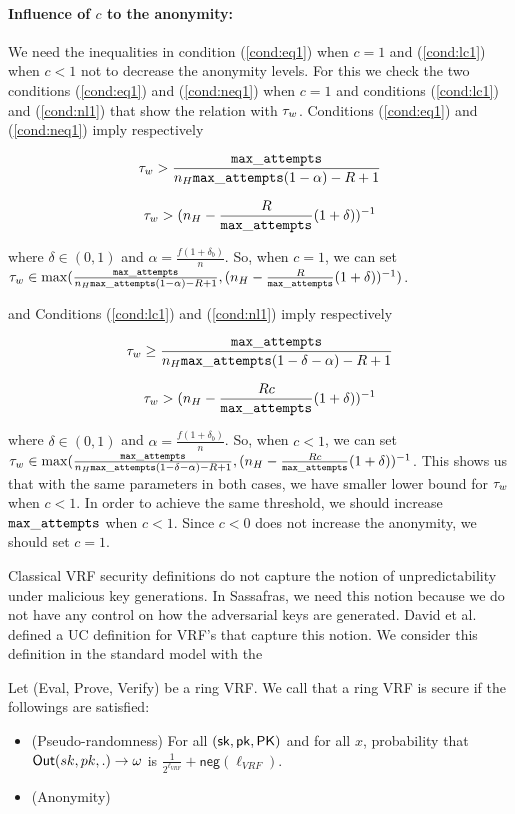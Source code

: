 \paragraph{Influence of $ c $ to the anonymity:} We need the inequalities in condition  (\ref{cond:eq1}) when $ c = 1 $ and (\ref{cond:lc1}) when $ c < 1 $ not to decrease the anonymity levels. For this we check the two conditions (\ref{cond:eq1})  and (\ref{cond:neq1}) when $ c = 1 $ and conditions (\ref{cond:lc1}) and (\ref{cond:nl1}) that show the relation with $ \tau_w $. Conditions (\ref{cond:eq1})  and (\ref{cond:neq1}) imply respectively 

$$\tau_w > \frac{\mathtt{max\_attempts}}{n_H \mathtt{max\_attempts} (1-\alpha)-R +1}$$


$$  \tau_w >({n_H -\frac{R}{\mathtt{max\_attempts}} (1+\delta)})^{-1}$$

where $ \delta \in (0,1) $ and $ \alpha = \frac{f(1+\delta_b)}{n} $. 
So, when $ c = 1 $, we can set  $ \tau_w \in \max( \frac{\mathtt{max\_attempts}}{n_H \mathtt{max\_attempts} (1-\alpha)-R +1}, ({n_H -\frac{R}{\mathtt{max\_attempts}} (1+\delta)})^{-1}) $.

and Conditions  (\ref{cond:lc1})  and (\ref{cond:nl1}) imply respectively 

$$\tau_w \geq \frac{\mathtt{max\_attempts}}{n_H  \mathtt{max\_attempts} (1-\delta-\alpha)-R +1}$$


$$  \tau_w > ({n_H -\frac{Rc}{\mathtt{max\_attempts}} (1+\delta)})^{-1}$$

where $ \delta \in (0,1) $ and $ \alpha = \frac{f(1+\delta_b)}{n} $. 
So, when $ c < 1 $, we can set  $ \tau_w \in \max(\frac{\mathtt{max\_attempts}}{n_H  \mathtt{max\_attempts} (1-\delta-\alpha)-R +1}, ({n_H -\frac{Rc}{\mathtt{max\_attempts}} (1+\delta)})^{-1}  $.
This shows us that with the same parameters in both cases, we have smaller lower bound for $ \tau_w $ when $c < 1 $. In order to achieve the same threshold, we should increase $ \mathtt{max\_attempts} $ when $ c < 1 $. Since $ c < 0$ does not increase the anonymity, we should set $ c = 1 $.



Classical VRF security definitions do not capture the notion of unpredictability under malicious key generations. In Sassafras, we need this notion because we do not have any control on how the adversarial keys are generated. David et al. \cite{praos} defined a UC definition for VRF's that capture this notion. We consider this definition in the standard model with the   

\begin{definition}
	Let (Eval, Prove, Verify) be a ring VRF. We call that a ring VRF is secure if the followings are satisfied:
	
	\begin{itemize}
		\item (Pseudo-randomness) For all $ (\mathsf{sk}, \mathsf{pk}, \mathsf{PK}) $ and for all $ x $, probability that $ \mathsf{Out}(sk, pk, .)\rightarrow \omega $ is $ \frac{1}{2^{\ell_{VRF}}} + \mathsf{neg}(\ell_{VRF}) $.
		\item (Anonymity)	
	\end{itemize}
	
\end{definition}

